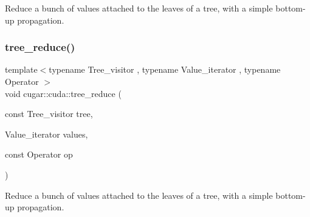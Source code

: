 Reduce a bunch of values attached to the leaves of a tree, with a simple bottom-\/up propagation. \mbox{\label{group___trees_module_gaf560f435723578e34050172fab671529}} 
\subsubsection{\texorpdfstring{tree\+\_\+reduce()}{tree\_reduce()}\hspace{0.1cm}{\footnotesize\ttfamily [4/4]}}
{\footnotesize\ttfamily template$<$typename Tree\+\_\+visitor , typename Value\+\_\+iterator , typename Operator $>$ \\
void cugar\+::cuda\+::tree\+\_\+reduce (\begin{DoxyParamCaption}\item[{const Tree\+\_\+visitor}]{tree,  }\item[{Value\+\_\+iterator}]{values,  }\item[{const Operator}]{op }\end{DoxyParamCaption})}

Reduce a bunch of values attached to the leaves of a tree, with a simple bottom-\/up propagation. 